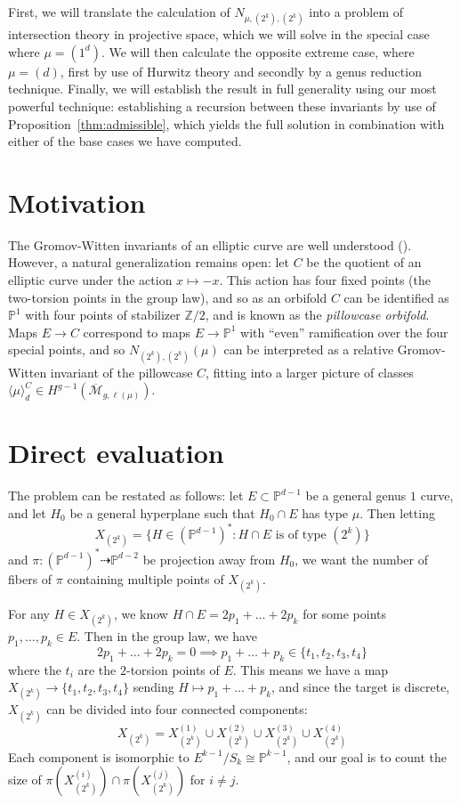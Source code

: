 \documentclass[thesis]{thesis-umich}           %
\newcommand{\Z}{\ensuremath{\mathbb{Z}}}
\renewcommand{\P}{\mathbb P}
\theoremstyle{definition}
\begin{document}
First, we will translate the calculation of $N_{\mu,(2^k),(2^k)}$ into a problem of intersection theory
in projective space, which we will solve in the special case where $\mu=(1^d)$.
We will then calculate the opposite extreme case, where $\mu=(d)$, first by use of Hurwitz theory and
secondly by a genus reduction technique. Finally, we will establish the result in full generality using
our most powerful technique: establishing a recursion between these invariants by use of Proposition~\ref{thm:admissible}, which yields the full solution in combination with either of the base
cases we have computed.

\section{Motivation}

The Gromov-Witten invariants of an elliptic curve are well understood (\cite{Completed}). However, a natural generalization
remains open: let $C$ be the quotient of an elliptic curve under the action $x\mapsto -x$.
This action has four fixed points (the two-torsion points in the group law), and so as an orbifold
$C$ can be identified as $\P^1$ with four points of stabilizer $\Z/2$, and is known as the
{\it pillowcase orbifold}. Maps $E\to C$ correspond to maps $E\to\P^1$ with ``even'' ramification over
the four special points, and so $N_{(2^k),(2^k)}(\mu)$ can be interpreted as a relative Gromov-Witten
invariant of the pillowcase $C$, fitting into a larger picture of classes $\langle \mu\rangle_d^{C}\in H^{g-1}(\overline{\mathcal M}_{g,\ell(\mu)})$.

\section{Direct evaluation}
\label{section:direct2}

The problem can be restated as follows: let $E\subset \P^{d-1}$ be a general genus $1$ curve,
and let $H_0$ be a general hyperplane such that $H_0\cap E$ has type $\mu$. Then letting \[X_{(2^k)}=\{H\in(\P^{d-1})^*:H\cap E\text{ is of type }(2^k)\}\]
and $\pi:(\P^{d-1})^*\dashrightarrow \P^{d-2}$ be projection away from $H_0$, we want the number of fibers of $\pi$
containing multiple points of $X_{(2^k)}$.

For any $H\in X_{(2^k)}$, we know $H\cap E=2p_1+\dots+2p_k$ for some points $p_1,\dots,p_k\in E$. Then in the group law, we have
\[
2p_1+\dots+2p_k=0\implies p_1+\dots+p_k\in\{t_1,t_2,t_3,t_4\}
\]
where the $t_i$ are the $2$-torsion points of $E$. This means we have a map $X_{(2^k)}\to\{t_1,t_2,t_3,t_4\}$ sending $H\mapsto p_1+\dots+p_k$, and since the target is discrete, $X_{(2^k)}$ can be divided into four connected components:
\[
X_{(2^k)}=X_{(2^k)}^{(1)}\cup X_{(2^k)}^{(2)}\cup X_{(2^k)}^{(3)}\cup X_{(2^k)}^{(4)}
\]
Each component is isomorphic to $E^{k-1}/S_k\cong \P^{k-1}$,
and our goal is to count the size of $\pi(X_{(2^k)}^{(i)})\cap \pi(X_{(2^k)}^{(j)})$
for $i\neq j$.
\end{document}
